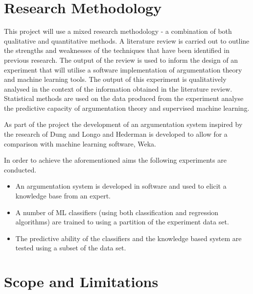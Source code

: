 
\section{Research Methodology}


This project will use a mixed research methodology - a combination of both qualitative and quantitative methods. A literature review is carried out to outline the strengths and weaknesses of the techniques that have been identified in previous research. The output of the review is used to inform the design of an experiment that will utilise a software implementation of argumentation theory and machine learning tools. The output of this experiment is qualitatively analysed in the context of the information obtained in the literature review. Statistical methods are used on the data produced from the experiment analyse the predictive capacity of argumentation theory and supervised machine learning. 

As part of the project the development of an argumentation system inspired by the research of Dung and Longo and Hederman is developed to allow for a comparison with machine learning software, Weka. 

In order to achieve the aforementioned aims the following experiments are conducted.

\begin{itemize}

  \item An argumentation system is developed in software and used to elicit a knowledge base from an expert.
  \item A number of ML classifiers (using both classification and regression algorithms) are trained to using a partition of the experiment data set.
  \item The predictive ability of the classifiers and the knowledge based system are tested using a subset of the data set.

\end{itemize}



\section{Scope and Limitations}

